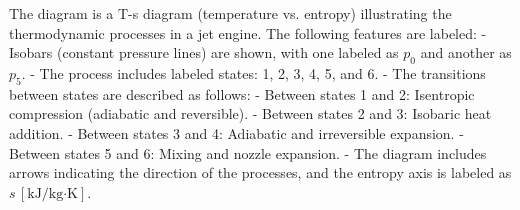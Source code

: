 The diagram is a T-s diagram (temperature vs. entropy) illustrating the thermodynamic processes in a jet engine. The following features are labeled:  
- Isobars (constant pressure lines) are shown, with one labeled as \( p_0 \) and another as \( p_5 \).  
- The process includes labeled states: 1, 2, 3, 4, 5, and 6.  
- The transitions between states are described as follows:  
  - Between states 1 and 2: Isentropic compression (adiabatic and reversible).  
  - Between states 2 and 3: Isobaric heat addition.  
  - Between states 3 and 4: Adiabatic and irreversible expansion.  
  - Between states 5 and 6: Mixing and nozzle expansion.  
- The diagram includes arrows indicating the direction of the processes, and the entropy axis is labeled as \( s \, [\text{kJ/kg·K}] \).